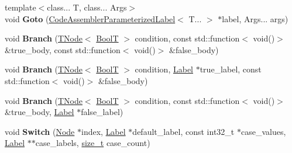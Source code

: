 \begin{DoxyCompactItemize}
\item 
\mbox{\label{classv8_1_1internal_1_1compiler_1_1CodeAssembler_a68012699042d74b7ac4f9a1f6443ed4d}} 
{\footnotesize template$<$class... T, class... Args$>$ }\\void {\bfseries Goto} (\mbox{\hyperlink{classv8_1_1internal_1_1compiler_1_1CodeAssemblerParameterizedLabel}{Code\+Assembler\+Parameterized\+Label}}$<$ T... $>$ $\ast$label, Args... args)
\item 
\mbox{\label{classv8_1_1internal_1_1compiler_1_1CodeAssembler_a8fe319a4d2d8927ed0d74813198a5209}} 
void {\bfseries Branch} (\mbox{\hyperlink{classv8_1_1internal_1_1compiler_1_1TNode}{T\+Node}}$<$ \mbox{\hyperlink{structv8_1_1internal_1_1BoolT}{BoolT}} $>$ condition, const std\+::function$<$ void()$>$ \&true\+\_\+body, const std\+::function$<$ void()$>$ \&false\+\_\+body)
\item 
\mbox{\label{classv8_1_1internal_1_1compiler_1_1CodeAssembler_a82365a6113f7479933e8b242d40e38c1}} 
void {\bfseries Branch} (\mbox{\hyperlink{classv8_1_1internal_1_1compiler_1_1TNode}{T\+Node}}$<$ \mbox{\hyperlink{structv8_1_1internal_1_1BoolT}{BoolT}} $>$ condition, \mbox{\hyperlink{classv8_1_1internal_1_1compiler_1_1CodeAssemblerLabel}{Label}} $\ast$true\+\_\+label, const std\+::function$<$ void()$>$ \&false\+\_\+body)
\item 
\mbox{\label{classv8_1_1internal_1_1compiler_1_1CodeAssembler_a2b30cf14de6c30bae2c97d1361a497c6}} 
void {\bfseries Branch} (\mbox{\hyperlink{classv8_1_1internal_1_1compiler_1_1TNode}{T\+Node}}$<$ \mbox{\hyperlink{structv8_1_1internal_1_1BoolT}{BoolT}} $>$ condition, const std\+::function$<$ void()$>$ \&true\+\_\+body, \mbox{\hyperlink{classv8_1_1internal_1_1compiler_1_1CodeAssemblerLabel}{Label}} $\ast$false\+\_\+label)
\item 
\mbox{\label{classv8_1_1internal_1_1compiler_1_1CodeAssembler_a9d1ac278e0b5bb21cd0787fc0ff3b34d}} 
void {\bfseries Switch} (\mbox{\hyperlink{classv8_1_1internal_1_1compiler_1_1Node}{Node}} $\ast$index, \mbox{\hyperlink{classv8_1_1internal_1_1compiler_1_1CodeAssemblerLabel}{Label}} $\ast$default\+\_\+label, const int32\+\_\+t $\ast$case\+\_\+values, \mbox{\hyperlink{classv8_1_1internal_1_1compiler_1_1CodeAssemblerLabel}{Label}} $\ast$$\ast$case\+\_\+labels, \mbox{\hyperlink{classsize__t}{size\+\_\+t}} case\+\_\+count)
$$
\end{DoxyCompactItemize}

